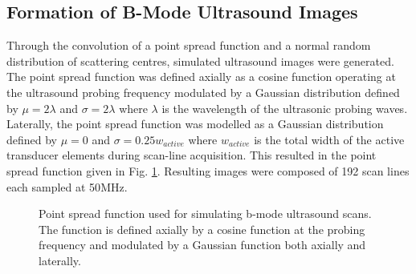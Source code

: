 		\subsection{Formation of B-Mode Ultrasound Images}
			 Through the convolution of a point spread function and a normal random distribution of scattering centres, simulated ultrasound images were generated. The point spread function was defined axially as a cosine function operating at the ultrasound probing frequency modulated by a Gaussian distribution defined by $\mu = 2\lambda$ and $\sigma = 2\lambda$ where $\lambda$ is the wavelength of the ultrasonic probing waves. Laterally, the point spread function was modelled as a Gaussian distribution defined by $\mu = 0$ and $\sigma = 0.25w_{active}$ where $w_{active}$ is the total width of the active transducer elements during scan-line acquisition.  This resulted in the point spread function given in Fig. \ref{fig:point_spread_function}. Resulting images were composed of 192 scan lines each sampled at \unit{50}{MHz}.

			\begin{figure}[!t]
				\centering
				\caption[Point spread function used for simulating ultrasound images]{Point spread function used for simulating b-mode ultrasound scans. The function is defined axially by a cosine function at the probing frequency and modulated by a Gaussian function both axially and laterally.}
				\label{fig:point_spread_function}
			\end{figure}

